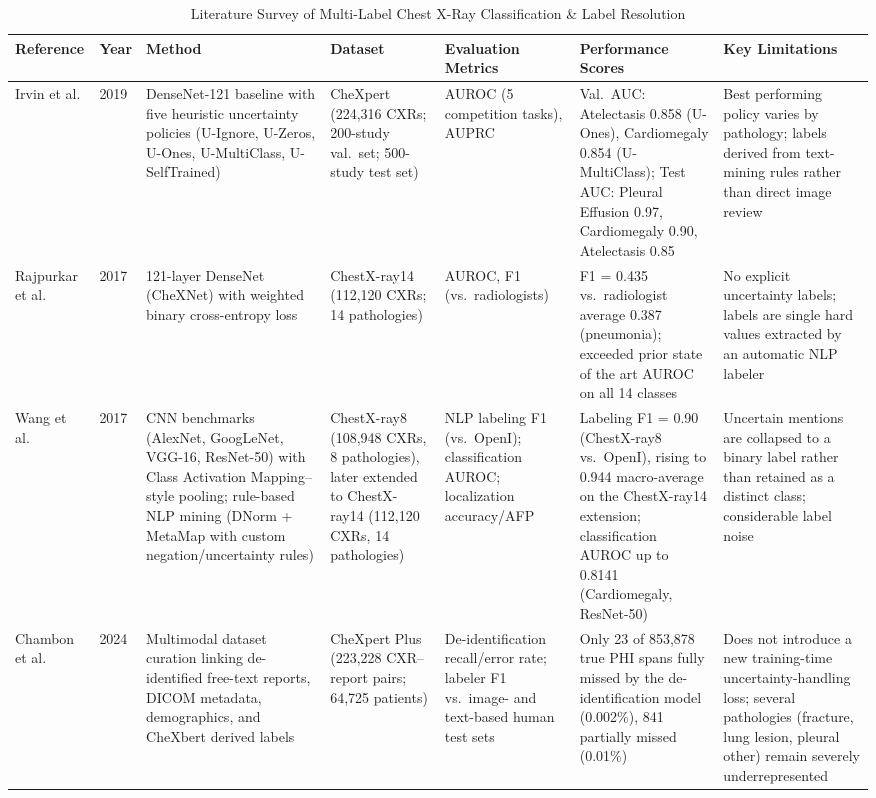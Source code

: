 \documentclass[conference]{IEEEtran}
\begin{document}
\begin{table}[!t]
\centering
\caption{Literature Survey of Multi-Label Chest X-Ray Classification \& Label Resolution}
\label{tab:litsurvey}
\scriptsize
\renewcommand{\arraystretch}{1.1}
\setlength{\tabcolsep}{3pt}
\begin{tabular}{P{0.09}P{0.04}P{0.18}P{0.15}P{0.11}P{0.18}P{0.15}}
\toprule
\textbf{Reference} & \textbf{Year} & \textbf{Method} & \textbf{Dataset} & \textbf{Evaluation Metrics} & \textbf{Performance Scores} & \textbf{Key Limitations} \\
\midrule
Irvin et al. \cite{ref1} & 2019 & DenseNet-121 baseline with five heuristic uncertainty policies (U-Ignore, U-Zeros, U-Ones, U-MultiClass, U-SelfTrained) & CheXpert (224,316 CXRs; 200-study val.\ set; 500-study test set) & AUROC (5 competition tasks), AUPRC & Val.\ AUC: Atelectasis 0.858 (U-Ones), Cardiomegaly 0.854 (U-MultiClass); Test AUC: Pleural Effusion 0.97, Cardiomegaly 0.90, Atelectasis 0.85 & Best performing policy varies by pathology; labels derived from text-mining rules rather than direct image review \\
\midrule
Rajpurkar et al. \cite{ref2} & 2017 & 121-layer DenseNet (CheXNet) with weighted binary cross-entropy loss & ChestX-ray14 (112,120 CXRs; 14 pathologies) & AUROC, F1 (vs.\ radiologists) & F1 = 0.435 vs.\ radiologist average 0.387 (pneumonia); exceeded prior state of the art AUROC on all 14 classes & No explicit uncertainty labels; labels are single hard values extracted by an automatic NLP labeler \\
\midrule
Wang et al. \cite{ref3} & 2017 & CNN benchmarks (AlexNet, GoogLeNet, VGG-16, ResNet-50) with Class Activation Mapping--style pooling; rule-based NLP mining (DNorm + MetaMap with custom negation/uncertainty rules) & ChestX-ray8 (108,948 CXRs, 8 pathologies), later extended to ChestX-ray14 (112,120 CXRs, 14 pathologies) & NLP labeling F1 (vs.\ OpenI); classification AUROC; localization accuracy/AFP & Labeling F1 = 0.90 (ChestX-ray8 vs.\ OpenI), rising to 0.944 macro-average on the ChestX-ray14 extension; classification AUROC up to 0.8141 (Cardiomegaly, ResNet-50) & Uncertain mentions are collapsed to a binary label rather than retained as a distinct class; considerable label noise \\
\midrule
Chambon et al. \cite{ref4} & 2024 & Multimodal dataset curation linking de-identified free-text reports, DICOM metadata, demographics, and CheXbert derived labels & CheXpert Plus (223,228 CXR--report pairs; 64,725 patients) & De-identification recall/error rate; labeler F1 vs.\ image- and text-based human test sets & Only 23 of 853,878 true PHI spans fully missed by the de-identification model (0.002\%), 841 partially missed (0.01\%) & Does not introduce a new training-time uncertainty-handling loss; several pathologies (fracture, lung lesion, pleural other) remain severely underrepresented \\

\end{tabular}
\end{table}
\end{document}
